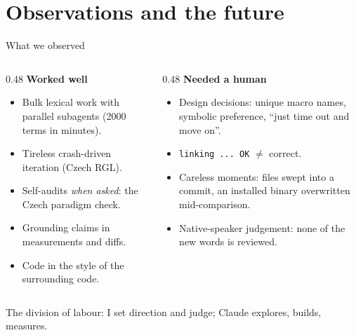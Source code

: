 \documentclass[10pt,aspectratio=169]{beamer}
\newcommand{\bad}[1]{\textcolor{warn}{#1}}
\newcommand{\ok}[1]{\textcolor{good}{#1}}
\begin{document}
\section{Observations and the future}

\begin{frame}{What we observed}
  \begin{columns}[T]
    \begin{column}{0.48\textwidth}
      \ok{\textbf{Worked well}}
      \begin{itemize}\small
        \item Bulk lexical work with parallel subagents (2000 terms in minutes).
        \item Tireless crash-driven iteration (Czech RGL).
        \item Self-audits \emph{when asked}: the Czech paradigm check.
        \item Grounding claims in measurements and diffs.
        \item Code in the style of the surrounding code.
      \end{itemize}
    \end{column}
    \begin{column}{0.48\textwidth}
      \bad{\textbf{Needed a human}}
      \begin{itemize}\small
        \item Design decisions: unique macro names, symbolic preference,
              ``just time out and move on''.
        \item \texttt{linking ... OK} $\neq$ correct.
        \item Careless moments: files swept into a commit, an installed binary
              overwritten mid-comparison.
        \item Native-speaker judgement: none of the new words is reviewed.
      \end{itemize}
    \end{column}
  \end{columns}
  \vspace{0.5em}
  \centering\small
  The division of labour: I set direction and judge; Claude explores, builds, measures.
\end{frame}
\end{document}

